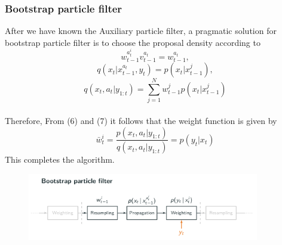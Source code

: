 \documentclass[11pt,oneside,a4paper]{article}
\begin{document}
\subsubsection{Bootstrap particle filter}
After we have known the Auxiliary particle filter, a pragmatic solution for bootstrap particle filter is to choose the proposal density according to
\begin{equation}
w_{t-1}^{a_{t}^{i}} v_{t-1}^{a_{t}} = w_{t-1}^{a_{t}},
\end{equation}
\begin{equation}
q(x_{t}|x_{t-1}^{a_{t}}, y_{t}) = p(x_{t}|x_{t-1}^{j}),
\end{equation}
\begin{equation}
q(x_{t}, a_{t} | y_{1:t}) = \sum_{j=1}^{N}w_{t-1}^{j}p(x_{t}|x_{t-1}^{j})
\end{equation} \\
Therefore, From (6) and (7) it follows that the weight function is given by
\begin{equation}
\bar{w}_{t}^{i} = \frac{p(x_{t}, a_{t}|y_{1:t})}{q(x_{t}, a_{t}|y_{1:t})} = p(y_{t}|x_{t})
\end{equation}
This completes the algorithm.
\begin{figure}[H]
  \begin{center}
  \includegraphics[width=0.9\textwidth]{./source/6.png}
  \caption{}
  \end{center}
  \label{}
\end{figure}
\end{document}
